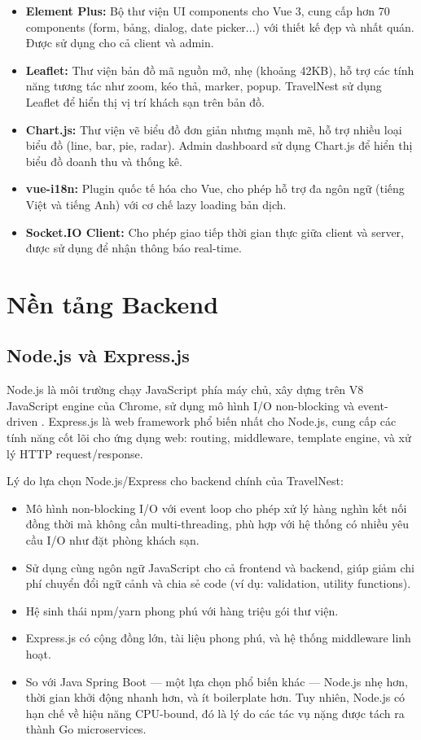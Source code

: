 \documentclass[13pt,a4paper,twoside]{report}
\begin{document}
\begin{itemize}
  \item \textbf{Element Plus:} Bộ thư viện UI components cho Vue 3, cung cấp hơn 70 components (form, bảng, dialog, date picker...) với thiết kế đẹp và nhất quán. Được sử dụng cho cả client và admin.
  \item \textbf{Leaflet:} Thư viện bản đồ mã nguồn mở, nhẹ (khoảng 42KB), hỗ trợ các tính năng tương tác như zoom, kéo thả, marker, popup. TravelNest sử dụng Leaflet để hiển thị vị trí khách sạn trên bản đồ.
  \item \textbf{Chart.js:} Thư viện vẽ biểu đồ đơn giản nhưng mạnh mẽ, hỗ trợ nhiều loại biểu đồ (line, bar, pie, radar). Admin dashboard sử dụng Chart.js để hiển thị biểu đồ doanh thu và thống kê.
  \item \textbf{vue-i18n:} Plugin quốc tế hóa cho Vue, cho phép hỗ trợ đa ngôn ngữ (tiếng Việt và tiếng Anh) với cơ chế lazy loading bản dịch.
  \item \textbf{Socket.IO Client:} Cho phép giao tiếp thời gian thực giữa client và server, được sử dụng để nhận thông báo real-time.
\end{itemize}

\section{Nền tảng Backend}

\subsection{Node.js và Express.js}

Node.js là môi trường chạy JavaScript phía máy chủ, xây dựng trên V8 JavaScript engine của Chrome, sử dụng mô hình I/O non-blocking và event-driven \cite{nodejs2024official}. Express.js là web framework phổ biến nhất cho Node.js, cung cấp các tính năng cốt lõi cho ứng dụng web: routing, middleware, template engine, và xử lý HTTP request/response.

Lý do lựa chọn Node.js/Express cho backend chính của TravelNest:

\begin{itemize}
  \item Mô hình non-blocking I/O với event loop cho phép xử lý hàng nghìn kết nối đồng thời mà không cần multi-threading, phù hợp với hệ thống có nhiều yêu cầu I/O như đặt phòng khách sạn.
  \item Sử dụng cùng ngôn ngữ JavaScript cho cả frontend và backend, giúp giảm chi phí chuyển đổi ngữ cảnh và chia sẻ code (ví dụ: validation, utility functions).
  \item Hệ sinh thái npm/yarn phong phú với hàng triệu gói thư viện.
  \item Express.js có cộng đồng lớn, tài liệu phong phú, và hệ thống middleware linh hoạt.
  \item So với Java Spring Boot --- một lựa chọn phổ biến khác --- Node.js nhẹ hơn, thời gian khởi động nhanh hơn, và ít boilerplate hơn. Tuy nhiên, Node.js có hạn chế về hiệu năng CPU-bound, đó là lý do các tác vụ nặng được tách ra thành Go microservices.
\end{itemize}
\end{document}
